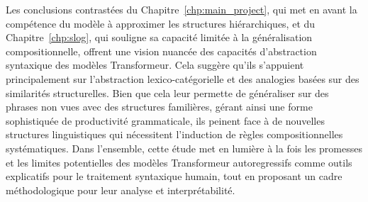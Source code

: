 Les conclusions contrastées du Chapitre~\ref{chp:main_project}, qui met en avant la compétence du modèle à approximer les structures hiérarchiques, et du Chapitre~\ref{chp:slog}, qui souligne sa capacité limitée à la généralisation compositionnelle, offrent une vision nuancée des capacités d'abstraction syntaxique des modèles Transformeur. Cela suggère qu'ils s'appuient principalement sur l'abstraction lexico-catégorielle et des analogies basées sur des similarités structurelles. Bien que cela leur permette de généraliser sur des phrases non vues avec des structures familières, gérant ainsi une forme sophistiquée de productivité grammaticale, ils peinent face à de nouvelles structures linguistiques qui nécessitent l'induction de règles compositionnelles systématiques. Dans l'ensemble, cette étude met en lumière à la fois les promesses et les limites potentielles des modèles Transformeur autoregressifs comme outils explicatifs pour le traitement syntaxique humain, tout en proposant un cadre méthodologique pour leur analyse et interprétabilité.
